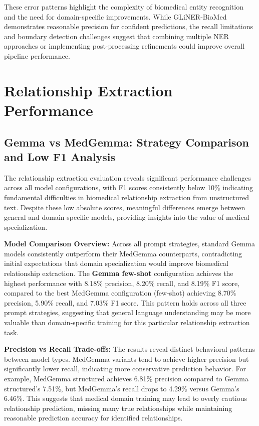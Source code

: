 These error patterns highlight the complexity of biomedical entity recognition and the need for domain-specific improvements. While GLiNER-BioMed demonstrates reasonable precision for confident predictions, the recall limitations and boundary detection challenges suggest that combining multiple NER approaches or implementing post-processing refinements could improve overall pipeline performance.


\section{Relationship Extraction Performance}

\subsection{Gemma vs MedGemma: Strategy Comparison and Low F1 Analysis}

The relationship extraction evaluation reveals significant performance challenges across all model configurations, with F1 scores consistently below 10\% indicating fundamental difficulties in biomedical relationship extraction from unstructured text. Despite these low absolute scores, meaningful differences emerge between general and domain-specific models, providing insights into the value of medical specialization.

\textbf{Model Comparison Overview:} Across all prompt strategies, standard Gemma models consistently outperform their MedGemma counterparts, contradicting initial expectations that domain specialization would improve biomedical relationship extraction. The \textbf{Gemma few-shot} configuration achieves the highest performance with 8.18\% precision, 8.20\% recall, and 8.19\% F1 score, compared to the best MedGemma configuration (few-shot) achieving 8.70\% precision, 5.90\% recall, and 7.03\% F1 score. This pattern holds across all three prompt strategies, suggesting that general language understanding may be more valuable than domain-specific training for this particular relationship extraction task.

\textbf{Precision vs Recall Trade-offs:} The results reveal distinct behavioral patterns between model types. MedGemma variants tend to achieve higher precision but significantly lower recall, indicating more conservative prediction behavior. For example, MedGemma structured achieves 6.81\% precision compared to Gemma structured's 7.51\%, but MedGemma's recall drops to 4.29\% versus Gemma's 6.46\%. This suggests that medical domain training may lead to overly cautious relationship prediction, missing many true relationships while maintaining reasonable prediction accuracy for identified relationships.

